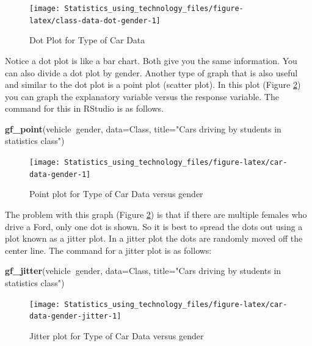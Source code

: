 \documentclass[
]{book}
\newenvironment{Shaded}{\begin{snugshade}}{\end{snugshade}}
\newcommand{\DataTypeTok}[1]{\textcolor[rgb]{0.13,0.29,0.53}{#1}}
\newcommand{\KeywordTok}[1]{\textcolor[rgb]{0.13,0.29,0.53}{\textbf{#1}}}
\newcommand{\NormalTok}[1]{#1}
\newcommand{\OperatorTok}[1]{\textcolor[rgb]{0.81,0.36,0.00}{\textbf{#1}}}
\newcommand{\StringTok}[1]{\textcolor[rgb]{0.31,0.60,0.02}{#1}}
\begin{document}
\begin{figure}
\texttt{[image: Statistics\_using\_technology\_files/figure-latex/class-data-dot-gender-1]} \caption{Dot Plot for Type of Car Data}\label{fig:class-data-dot-gender}
\end{figure}

Notice a dot plot is like a bar chart. Both give you the same information. You can also divide a dot plot by gender. Another type of graph that is also useful and similar to the dot plot is a point plot (scatter plot). In this plot (Figure \ref{fig:car-data-gender}) you can graph the explanatory variable versus the response variable. The command for this in RStudio is as follows.



\begin{Shaded}
\begin{Highlighting}[]
\KeywordTok{gf_point}\NormalTok{(vehicle}\OperatorTok{~}\NormalTok{gender, }\DataTypeTok{data=}\NormalTok{Class, }
         \DataTypeTok{title=}\StringTok{"Cars driving by students in statistics class"}\NormalTok{)}
\end{Highlighting}
\end{Shaded}

\begin{figure}
\texttt{[image: Statistics\_using\_technology\_files/figure-latex/car-data-gender-1]} \caption{Point plot for Type of Car Data versus gender}\label{fig:car-data-gender}
\end{figure}

The problem with this graph (Figure \ref{fig:car-data-gender}) is that if there are multiple females who drive a Ford, only one dot is shown. So it is best to spread the dots out using a plot known as a jitter plot. In a jitter plot the dots are randomly moved off the center line. The command for a jitter plot is as follows:



\begin{Shaded}
\begin{Highlighting}[]
\KeywordTok{gf_jitter}\NormalTok{(vehicle}\OperatorTok{~}\NormalTok{gender, }\DataTypeTok{data=}\NormalTok{Class, }\DataTypeTok{title=}\StringTok{"Cars driving by students }
\StringTok{          in statistics class"}\NormalTok{)}
\end{Highlighting}
\end{Shaded}

\begin{figure}
\texttt{[image: Statistics\_using\_technology\_files/figure-latex/car-data-gender-jitter-1]} \caption{Jitter plot for Type of Car Data versus gender}\label{fig:car-data-gender-jitter}
\end{figure}
\end{document}

